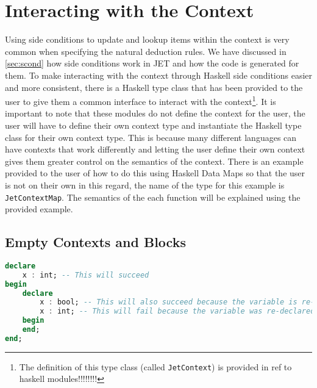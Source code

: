\section{Interacting with the Context}
\label{sec:context}
Using side conditions to update and lookup items within the context is very common when specifying the natural deduction rules.
We have discussed in \autoref{sec:scond} how side conditions work in JET and how the code is generated for them.
To make interacting with the context through Haskell side conditions easier and more consistent, there is a Haskell type class that has been provided to the user to give them a common interface to interact with the context\footnote{The definition of this type class (called \texttt{JetContext}) is provided in ref to haskell modules!!!!!!!!}.
It is important to note that these modules do not define the context for the user, the user will have to define their own context type and instantiate the Haskell type class for their own context type.
This is because many different languages can have contexts that work differently and letting the user define their own context gives them greater control on the semantics of the context.
There is an example provided to the user of how to do this using Haskell Data Maps\cite{haskelldatamap} so that the user is not on their own in this regard, the name of the type for this example is \texttt{JetContextMap}.
The semantics of the each function will be explained using the provided example.

\subsection{Empty Contexts and Blocks}
\label{sec:blocks}
\begin{lstlisting}[language=ada, caption=Example of declarations in a block structured language such as Ad, label=lst:blockDecl]
declare
    x : int; -- This will succeed
begin
    declare
        x : bool; -- This will also succeed because the variable is re-declared in a new block
        x : int; -- This will fail because the variable was re-declared in the same block as the previous declaration
    begin
    end;
end;
\end{lstlisting}

